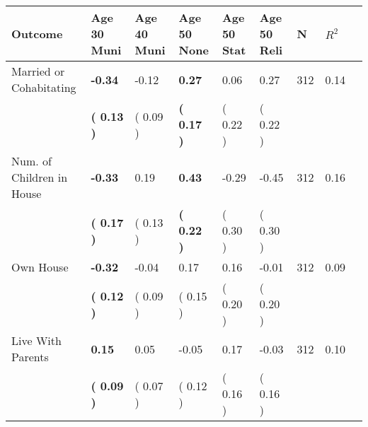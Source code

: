 \begin{tabular}{L{6.2cm} C{1.8cm} C{1.8cm} C{1.8cm} C{1.8cm} C{1.8cm} C{1.8cm} C{0.3cm} C{0.3cm}}
\toprule
 \textbf{Outcome} & \textbf{Age 30 Muni} & \textbf{Age 40 Muni} & \textbf{Age 50 None} & \textbf{Age 50 Stat} & \textbf{Age 50 Reli} & \textbf{N} & \textbf{$ R^2$} \\
\midrule
Married or Cohabitating & \textbf{    -0.34} &     -0.12 & \textbf{     0.27} &      0.06 &      0.27  & 312 &       0.14 \\ 
 & \textbf{(     0.13 )} & (     0.09 ) & \textbf{(     0.17 )} & (     0.22 ) & (     0.22 )  & \\
Num. of Children in House & \textbf{    -0.33} &      0.19 & \textbf{     0.43} &     -0.29 &     -0.45  & 312 &       0.16 \\ 
 & \textbf{(     0.17 )} & (     0.13 ) & \textbf{(     0.22 )} & (     0.30 ) & (     0.30 )  & \\
Own House & \textbf{    -0.32} &     -0.04 &      0.17 &      0.16 &     -0.01  & 312 &       0.09 \\ 
 & \textbf{(     0.12 )} & (     0.09 ) & (     0.15 ) & (     0.20 ) & (     0.20 )  & \\
Live With Parents & \textbf{     0.15} &      0.05 &     -0.05 &      0.17 &     -0.03  & 312 &       0.10 \\ 
 & \textbf{(     0.09 )} & (     0.07 ) & (     0.12 ) & (     0.16 ) & (     0.16 )  & \\
\bottomrule
\end{tabular}
